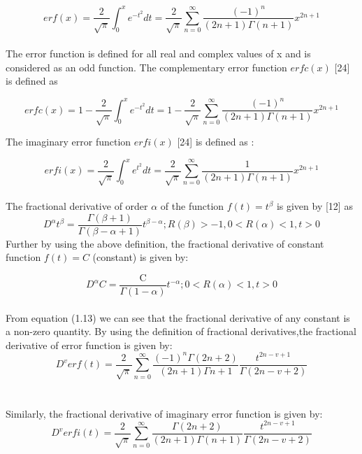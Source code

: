 \documentclass{article}
\begin{document}
\begin{equation}
    erf(x)=
    \frac{2}{\sqrt{\pi}}
    \int_0^{x}{e^{-t^2}}dt
    =\frac{2}{\sqrt{\pi}}
    \sum_{n = 0}^{\infty}
    \frac{{(-1)}^n}{(2n+1)\Gamma{(n+1)}}
    x^{2n+1}
\end{equation}
\paragraph{}
The error function is defined for all real and complex values of x and is considered as an odd function.
The complementary error function $erfc(x)$ [24] is defined as

\begin{equation}
    erfc(x)=
    1-\frac{2}{\sqrt{\pi}}
    \int_0^{x}{e^{-t^2}}dt
    =1-\frac{2}{\sqrt{\pi}}
    \sum_{n = 0}^{\infty}
    \frac{{(-1)}^n}{(2n+1)\Gamma{(n+1)}}
    x^{2n+1}
\end{equation}

The imaginary error function $erfi(x)$ [24] is defined as :

\begin{equation}
    erfi(x)=
    \frac{2}{\sqrt{\pi}}
    \int_0^{x}{e^{t^2}}dt
    =\frac{2}{\sqrt{\pi}}
    \sum_{n = 0}^{\infty}
    \frac{{1}}{(2n+1)\Gamma{(n+1)}}
    x^{2n+1}
\end{equation}
\\
The fractional derivative of order $\alpha$ of the function $f(t) = t^{\beta}$ is given by [12] as\\ 
\begin{equation}
    D^{\alpha}t^{\beta}=
    \frac{\Gamma{(\beta + 1)}}{\Gamma{(\beta - \alpha + 1)}}
    t^{\beta - \alpha};
    R(\beta) > -1, 0
    < R(\alpha) < 1, t > 0
\end{equation}
Further by using the above definition, the fractional derivative of constant function $f(t) = C$ (constant) is given by:

\begin{equation}
    D^{\alpha}C = 
    \frac{\text{C}}{\Gamma{(1-\alpha)}}
    t^{- \alpha};
    0 < R(\alpha) < 1,
    t > 0
\end{equation}\\ 
From equation (1.13) we can see that the fractional derivative of any constant is a non-zero quantity.
By using the definition of fractional derivatives,the fractional derivative of error function is given by:
\begin{equation}
    D^v erf(t) = 
    \frac{2}{\sqrt{\pi}}
    \sum_{n = 0}^{\infty}
    \frac{{(-1)}^n\Gamma{(2n+2)}}{(2n+1)\Gamma{n+1}}
    \frac{t^{2n-v+1}}{\Gamma{(2n-v+2)}}
\end{equation}\\ 
\\ 
Similarly, the fractional derivative of imaginary error function is given by:
\\ 
\begin{equation}
    D^v erfi(t) = 
    \frac{2}{\sqrt{\pi}}
    \sum_{n = 0}^{\infty}
    \frac{{\Gamma{(2n+2)}}}{(2n+1)\Gamma{(n+1)}}
    \frac{t^{2n-v+1}}{\Gamma{(2n-v+2)}}
\end{equation}
\end{document}
